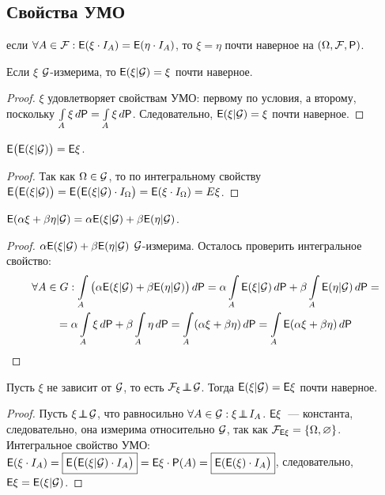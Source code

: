 \subsection{Свойства УМО}
\setcounter{property}{0}
 если $\forall A \in \F: \E(\xi \cdot I_A) = \E(\eta \cdot I_A)$, то $\xi = \eta$ почти наверное на $(\Omega, \F, \P)$.
\begin{property}
	Если $\xi$ $\G$-измерима, то $\E(\xi | \G) = \xi$ почти наверное. 
	\begin{proof}
		$\xi$ удовлетворяет свойствам УМО: первому по условия, а второму, поскольку $\int\limits_A \xi \, d\P = \int\limits_A \xi \, d\P$. Следовательно, $\E(\xi | \G) = \xi$ почти наверное.  
	\end{proof}
\end{property}
\begin{property}
	 $\E \big( \E( \xi | \G) \big) = \E\xi$.
	 \begin{proof}
	 	Так как $\Omega \in \G$, то по интегральному свойству $\E \big( \E(\xi | \G) \big) = \E \big( \E(\xi | \G ) \cdot I_\Omega \big) = \E( \xi \cdot I_\Omega) = E\xi$.
	 \end{proof}
\end{property}
\begin{property}[линейность]
	$\E (\alpha \xi + \beta \eta | \G ) = \alpha \E( \xi | \G) + \beta \E(\eta |\G)$.
	\begin{proof}
		$\alpha \E(\xi | \G) + \beta \E(\eta | \G)$ $\G$-измерима. Осталось проверить интегральное свойство:
		\begin{multline*}
			\forall A \in G: \int\limits_A \big( \alpha \E( \xi | \G) + \beta \E( \eta | \G) \big) \, d \P = \alpha \int\limits_A \E( \xi | \G) \, d \P + \beta \int\limits_A \E( \eta | \G ) \, d \P = \\ 
			= \alpha \int\limits_A \xi \, d \P + \beta \int\limits_A \eta \, d \P = \int\limits_A (\alpha \xi + \beta \eta ) \, d\P = \int\limits_A \E( \alpha\xi + \beta\eta) \, d \P
		\end{multline*}
	\end{proof}
\end{property}
\begin{property}
	Пусть $\xi$ не зависит от $\G$, то есть $\F_\xi \indep \G$. Тогда $\E ( \xi | \G) = \E \xi$ почти наверное.
	\begin{proof}
		Пусть $\xi \indep \G$, что равносильно $\forall A \in \G: \xi \indep I_A$. $\E \xi$~--- константа, следовательно, она измерима относительно $\G$, так как $\F_{\E \xi} = \{ \Omega, \varnothing \}$. Интегральное свойство УМО: $\E ( \xi \cdot I_A) = \boxed{\E \big( \E( \xi | \G) \cdot I_A \big)} = \E \xi \cdot \P(A) = \boxed{\E(\E(\xi) \cdot I_A \big)}$, следовательно, $\E \xi = \E( \xi | \G)$.
	\end{proof}
\end{property}
